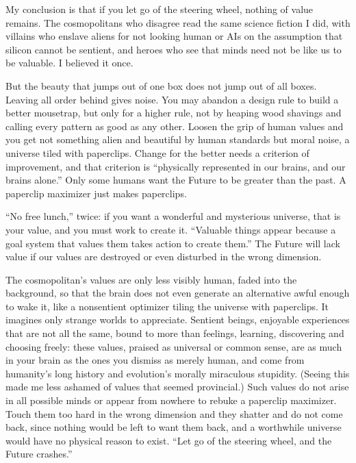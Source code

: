 My conclusion is that if you let go of the steering wheel, nothing of value remains. The cosmopolitans who disagree read the same science fiction I did, with villains who enslave aliens for not looking human or AIs on the assumption that silicon cannot be sentient, and heroes who see that minds need not be like us to be valuable. I believed it once.

But the beauty that jumps out of one box does not jump out of all boxes. Leaving all order behind gives noise. You may abandon a design rule to build a better mousetrap, but only for a higher rule, not by heaping wood shavings and calling every pattern as good as any other. Loosen the grip of human values and you get not something alien and beautiful by human standards but moral noise, a universe tiled with paperclips. Change for the better needs a criterion of improvement, and that criterion is ``physically represented in our brains, and our brains alone.'' Only some humans want the Future to be greater than the past. A paperclip maximizer just makes paperclips. 

``No free lunch,'' twice: if you want a wonderful and mysterious universe, that is your value, and you must work to create it. ``Valuable things appear because a goal system that values them takes action to create them.''  The Future will lack value if our values are destroyed or even disturbed in the wrong dimension. 

The cosmopolitan's values are only less visibly human, faded into the background, so that the brain does not even generate an alternative awful enough to wake it, like a nonsentient optimizer tiling the universe with paperclips. It imagines only strange worlds to appreciate. Sentient beings, enjoyable experiences that are not all the same, bound to more than feelings, learning, discovering and choosing freely: these values, praised as universal or common sense, are as much in your brain as the ones you dismiss as merely human, and come from humanity's long history and evolution's morally miraculous stupidity. (Seeing this made me less ashamed of values that seemed provincial.) Such values do not arise in all possible minds or appear from nowhere to rebuke a paperclip maximizer. Touch them too hard in the wrong dimension and they shatter and do not come back, since nothing would be left to want them back, and a worthwhile universe would have no physical reason to exist. ``Let go of the steering wheel, and the Future crashes.''
